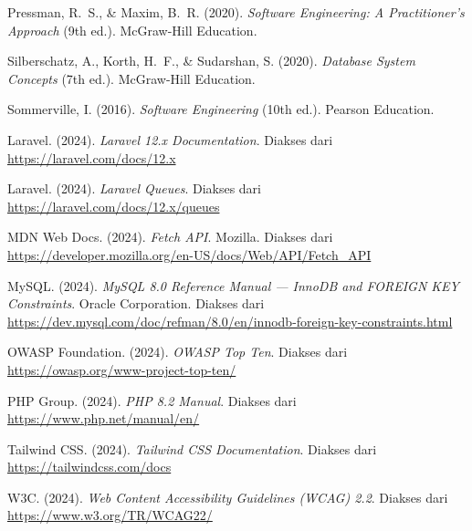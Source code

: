 \documentclass[11pt, a5paper]{article}
\begin{document}
\begin{enumerate}[label={[\arabic*]}, leftmargin=*, itemsep=8pt]
  \item %
        Pressman, R.~S., \& Maxim, B.~R. (2020).
        \textit{Software Engineering: A Practitioner's Approach}
        (9th ed.).
        McGraw-Hill Education.

  \item %
        Silberschatz, A., Korth, H.~F., \& Sudarshan, S. (2020).
        \textit{Database System Concepts} (7th ed.).
        McGraw-Hill Education.

  \item %
        Sommerville, I. (2016).
        \textit{Software Engineering} (10th ed.).
        Pearson Education.


  \item %
        Laravel. (2024). \textit{Laravel 12.x Documentation}.
        Diakses dari \url{https://laravel.com/docs/12.x}

  \item %
        Laravel. (2024). \textit{Laravel Queues}.
        Diakses dari \url{https://laravel.com/docs/12.x/queues}

  \item %
        MDN Web Docs. (2024). \textit{Fetch API}.
        Mozilla. Diakses dari
        \url{https://developer.mozilla.org/en-US/docs/Web/API/Fetch_API}

  \item %
        MySQL. (2024). \textit{MySQL 8.0 Reference Manual ---
        InnoDB and FOREIGN KEY Constraints}.
        Oracle Corporation. Diakses dari
        \url{https://dev.mysql.com/doc/refman/8.0/en/innodb-foreign-key-constraints.html}

  \item %
        OWASP Foundation. (2024). \textit{OWASP Top Ten}.
        Diakses dari \url{https://owasp.org/www-project-top-ten/}

  \item %
        PHP Group. (2024). \textit{PHP 8.2 Manual}.
        Diakses dari \url{https://www.php.net/manual/en/}

  \item %
        Tailwind CSS. (2024). \textit{Tailwind CSS Documentation}.
        Diakses dari \url{https://tailwindcss.com/docs}

  \item %
        W3C. (2024). \textit{Web Content Accessibility Guidelines
        (WCAG) 2.2}. Diakses dari \url{https://www.w3.org/TR/WCAG22/}

\end{enumerate}

\end{document}
